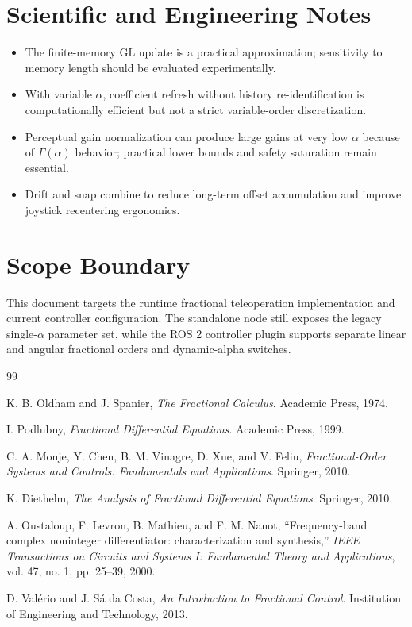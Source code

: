 \documentclass[11pt,a4paper]{article}
\begin{document}
\section{Scientific and Engineering Notes}
\begin{itemize}[leftmargin=*]
\item The finite-memory GL update is a practical approximation; sensitivity to memory length should be evaluated experimentally.
\item With variable $\alpha$, coefficient refresh without history re-identification is computationally efficient but not a strict variable-order discretization.
\item Perceptual gain normalization can produce large gains at very low $\alpha$ because of $\Gamma(\alpha)$ behavior; practical lower bounds and safety saturation remain essential.
\item Drift and snap combine to reduce long-term offset accumulation and improve joystick recentering ergonomics.
\end{itemize}

\section{Scope Boundary}
This document targets the runtime fractional teleoperation implementation and current controller configuration.
The standalone node still exposes the legacy single-\(\alpha\) parameter set, while the ROS 2 controller plugin supports
separate linear and angular fractional orders and dynamic-alpha switches.

\begin{thebibliography}{99}

K. B. Oldham and J. Spanier,
\emph{The Fractional Calculus}.
Academic Press, 1974.

I. Podlubny,
\emph{Fractional Differential Equations}.
Academic Press, 1999.

C. A. Monje, Y. Chen, B. M. Vinagre, D. Xue, and V. Feliu,
\emph{Fractional-Order Systems and Controls: Fundamentals and Applications}.
Springer, 2010.

K. Diethelm,
\emph{The Analysis of Fractional Differential Equations}.
Springer, 2010.

A. Oustaloup, F. Levron, B. Mathieu, and F. M. Nanot,
``Frequency-band complex noninteger differentiator: characterization and synthesis,''
\emph{IEEE Transactions on Circuits and Systems I: Fundamental Theory and Applications},
vol. 47, no. 1, pp. 25--39, 2000.

D. Val\'erio and J. S\'a da Costa,
\emph{An Introduction to Fractional Control}.
Institution of Engineering and Technology, 2013.

\end{thebibliography}
\end{document}
